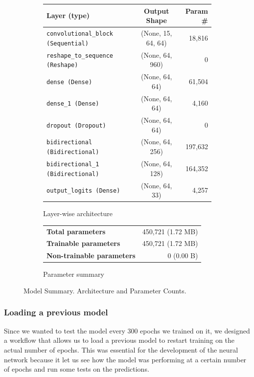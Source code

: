 \documentclass[11pt,letterpaper]{article}
\begin{document}
	\begin{figure}[!h]
		\centering
		\begin{subfigure}[b]{0.75\linewidth}
			\centering
			\begin{tabular}{|l|c|r|}
				\hline
				\textbf{Layer (type)} & \textbf{Output Shape} & \textbf{Param \#} \\
				\hline
				\texttt{convolutional\_block (Sequential)} & (None, 15, 64, 64) & 18,816 \\
				\texttt{reshape\_to\_sequence (Reshape)} & (None, 64, 960) & 0 \\
				\texttt{dense (Dense)} & (None, 64, 64) & 61,504 \\
				\texttt{dense\_1 (Dense)} & (None, 64, 64) & 4,160 \\
				\texttt{dropout (Dropout)} & (None, 64, 64) & 0 \\
				\texttt{bidirectional (Bidirectional)} & (None, 64, 256) & 197,632 \\
				\texttt{bidirectional\_1 (Bidirectional)} & (None, 64, 128) & 164,352 \\
				\texttt{output\_logits (Dense)} & (None, 64, 33) & 4,257 \\
				\hline
			\end{tabular}
			\caption{Layer-wise architecture}
			\label{tab:architecture}
		\end{subfigure}
		
		\vspace{1em}
	
		\begin{subfigure}[b]{0.75\linewidth}
			\centering
			\begin{tabular}{|l|r|}
				\hline
				\textbf{Total parameters} & 450,721 (1.72 MB) \\
				\textbf{Trainable parameters} & 450,721 (1.72 MB) \\
				\textbf{Non-trainable parameters} & 0 (0.00 B) \\
				\hline
			\end{tabular}
			\caption{Parameter summary}
		\end{subfigure}
		
		\caption{Model Summary. Architecture and Parameter Counts.}
		\label{fig:model_summary}
	\end{figure}
	
	\subsubsection{Loading a previous model} \label{subsubsec:loading_model}
	Since we wanted to test the model every 300 epochs we trained on it, we designed a workflow that allows us to load a previous model to restart training on the actual number of epochs. This was essential for the development of the neural network because it let us see how the model was performing at a certain number of epochs and run some tests on the predictions.
	
\end{document}
